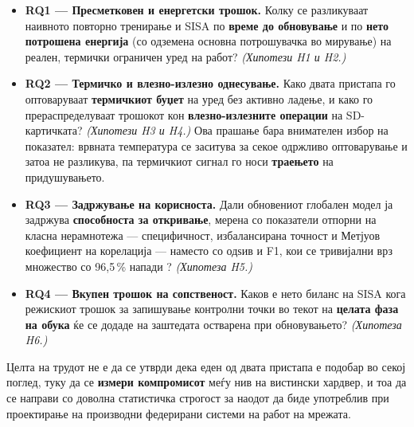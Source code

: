 \begin{itemize}
  \item \textbf{RQ1 --- Пресметковен и енергетски трошок.} Колку се разликуваат наивното повторно
  тренирање и SISA по \textbf{време до обновување} и по \textbf{нето потрошена енергија} (со
  одземена основна потрошувачка во мирување) на реален, термички ограничен уред на работ?
  \emph{(Хипотези H1 и H2.)}
  \item \textbf{RQ2 --- Термичко и влезно-излезно однесување.} Како двата пристапа го оптоваруваат
  \textbf{термичкиот буџет} на уред без активно ладење, и како го прераспределуваат трошокот
  кон \textbf{влезно-излезните операции} на SD-картичката? \emph{(Хипотези H3 и H4.)} Ова
  прашање бара внимателен избор на показател: врвната температура се заситува за секое
  одржливо оптоварување и затоа не разликува, па термичкиот сигнал го носи \textbf{траењето}
  на придушувањето.
  \item \textbf{RQ3 --- Задржување на корисноста.} Дали обновениот глобален модел ја задржува
  \textbf{способноста за откривање}, мерена со показатели отпорни на класна нерамнотежа ---
  специфичност, избалансирана точност и Метјуов коефициент на корелација --- наместо со
  одѕив и F1, кои се тривијални врз множество со 96,5\,\% напади \cite{chicco2020mcc,
  saito2015prc}? \emph{(Хипотеза H5.)}
  \item \textbf{RQ4 --- Вкупен трошок на сопственост.} Каков е нето биланс на SISA кога режискиот
  трошок за запишување контролни точки во текот на \textbf{целата фаза на обука} ќе се додаде
  на заштедата остварена при обновувањето? \emph{(Хипотеза H6.)}
\end{itemize}

Целта на трудот не е да се утврди дека еден од двата пристапа е подобар во секој поглед,
туку да се \textbf{измери компромисот} меѓу нив на вистински хардвер, и тоа да се направи со
доволна статистичка строгост за наодот да биде употреблив при проектирање на производни
федерирани системи на работ на мрежата.
